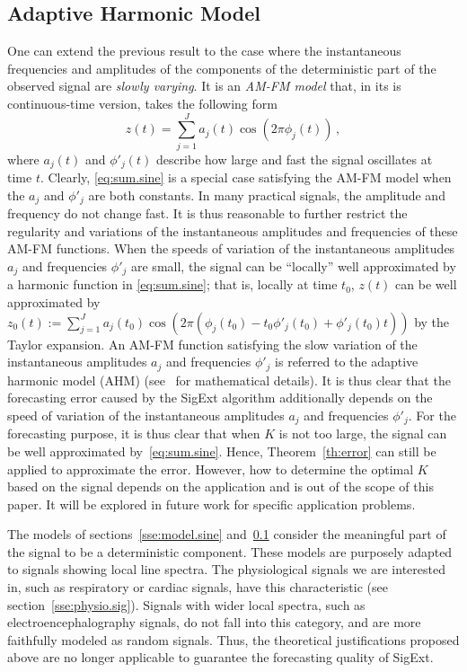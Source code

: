 \subsection{Adaptive Harmonic Model}
\label{RemarkAHM}

One can extend the previous result to the case where the instantaneous frequencies and amplitudes of the components of the deterministic part of the observed signal are {\em slowly varying}. It is an \textit{AM-FM model} that, in its is continuous-time version, takes the following form
\begin{equation}
z(t) = \sum_{j=1}^J a_j(t)\cos(2\pi\phi_j(t))\,,
\end{equation}
where $a_j(t)$ and $\phi'_j(t)$ describe how large and fast the signal oscillates at time $t$. 
Clearly, \eqref{eq:sum.sine} is a special case satisfying the AM-FM model when the $a_j$ and $\phi'_j$ are both constants. 
%
In many practical signals, the amplitude and frequency do not change fast. It is thus reasonable to further restrict the regularity and variations of the instantaneous amplitudes and frequencies of these AM-FM functions. When the speeds of variation of the instantaneous amplitudes $a_j$ and frequencies $\phi'_j$ are small, the signal can be ``locally'' well approximated by a harmonic function in \eqref{eq:sum.sine}; that is, 
%
locally at time $t_0$, $z(t)$ can be well approximated by $z_0(t) := \sum_{j=1}^J a_j(t_0)\cos(2\pi(\phi_j(t_0)-t_0\phi'_j(t_0)+\phi'_j(t_0)t))$ by the Taylor expansion. An AM-FM function satisfying the slow variation of the instantaneous amplitudes $a_j$ and frequencies $\phi'_j$ is referred to the adaptive harmonic model (AHM) (see~\cite{Chen14nonparametric,Daubechies16conceft} for mathematical details).
It is thus clear that the forecasting error caused by the {\sf SigExt} algorithm additionally depends on the speed of variation of the instantaneous amplitudes $a_j$ and frequencies $\phi'_j$. 
%
For the forecasting purpose, it is thus clear that when $K$ is not too large, the signal can be well approximated by~\eqref{eq:sum.sine}. Hence, Theorem~\ref{th:error} can still be applied to approximate the error. However, how to determine the optimal $K$ based on the signal depends on the application and is out of the scope of this paper. It will be explored in future work for specific application problems.

The models of sections~\ref{sse:model.sine} and~\ref{RemarkAHM} consider the meaningful part of the signal to be a deterministic component. These models are purposely adapted to signals showing local line spectra. The physiological signals we are interested in, such as respiratory or cardiac signals, have this characteristic (see section~\ref{sse:physio.sig}). Signals with wider local spectra, such as electroencephalography signals, do not fall into this category, and are more faithfully modeled as random signals. Thus, the theoretical justifications proposed above are no longer applicable to guarantee the forecasting quality of {\sf SigExt}.

